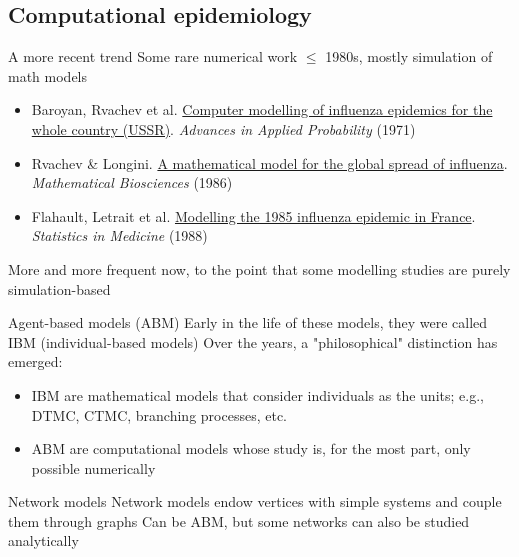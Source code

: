 \documentclass[aspectratio=169]{beamer}\usepackage[]{graphicx}\usepackage[]{xcolor}
\begin{document}
\subsection{Computational epidemiology}


\begin{frame}{A more recent trend}
\bbullet Some rare numerical work $\leq$ 1980s, mostly simulation of math models
\begin{itemize}
    \item Baroyan, Rvachev et al. \href{https://doi.org/10.2307/1426167}{Computer modelling of influenza epidemics for the whole country (USSR)}. \emph{Advances in Applied Probability} (1971) 
    \item Rvachev \& Longini. \href{https://doi.org/10.1016/0025-5564(85)90064-1}{A mathematical model for the global spread of influenza}. \emph{Mathematical Biosciences} (1986) 
    \item Flahault, Letrait et al. \href{https://doi.org/10.1002/sim.4780071107}{Modelling the 1985 influenza epidemic in France}. \emph{Statistics in Medicine} (1988)
\end{itemize}
\vfill
\bbullet More and more frequent now, to the point that some modelling studies are purely simulation-based
\end{frame}

\begin{frame}{Agent-based models (ABM)}
\bbullet Early in the life of these models, they were called IBM (individual-based models)
\vfill
\bbullet Over the years, a "philosophical" distinction has emerged:
\begin{itemize}
\item IBM are mathematical models that consider individuals as the units; e.g., DTMC, CTMC, branching processes, etc.
\item ABM are computational models whose study is, for the most part, only possible numerically
\end{itemize}
\end{frame}

\begin{frame}{Network models}
\bbullet Network models endow vertices with simple systems and couple them through graphs
\vfill
\bbullet Can be ABM, but some networks can also be studied analytically
\end{frame}

\end{document}
